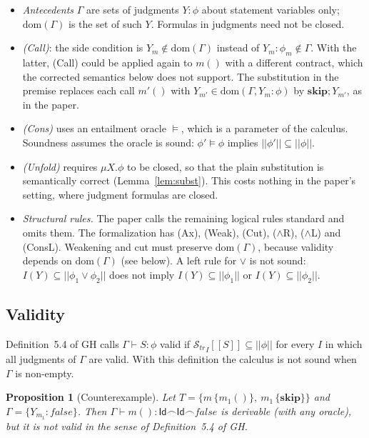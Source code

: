 \documentclass[11pt]{article}
\newcommand{\sem}[1]{[\![ #1 ]\!]}
\newcommand{\fsem}[1]{|\!|#1|\!|}
\newcommand{\Str}{{\mathcal{S}_{\mathit{tr}}}}
\newcommand{\chop}{\smallfrown}
\newcommand{\Id}{\mathsf{Id}}
\newcommand{\dom}{\mathrm{dom}}
\newcommand{\kw}[1]{\mathbf{#1}}
\newcommand{\skipS}{\kw{skip}}
\newcommand{\call}[1]{#1()}
\newcommand{\GH}[1]{#1 of GH}
\theoremstyle{plain}
\newtheorem{proposition}[theorem]{Proposition}
\theoremstyle{definition}
\theoremstyle{remark}
\begin{document}
\begin{itemize}
\item \emph{Antecedents} $\Gamma$ are sets of judgments $Y : \phi$ about
  statement variables only; $\dom(\Gamma)$ is the set of such $Y$. Formulas
  in judgments need not be closed.
\item \emph{(Call)}: the side condition is $Y_m \notin \dom(\Gamma)$ instead
  of $Y_m : \phi_m \notin \Gamma$. With the latter, (Call) could be applied
  again to $\call{m}$ with a different contract, which the corrected
  semantics below does not support. The substitution in the premise replaces
  each call $\call{m'}$ with $Y_{m'} \in \dom(\Gamma, Y_m : \phi)$ by
  $\skipS; Y_{m'}$, as in the paper.
\item \emph{(Cons)} uses an entailment oracle $\models$, which is a parameter
  of the calculus. Soundness assumes the oracle is sound: $\phi' \models
  \phi$ implies $\fsem{\phi'} \subseteq \fsem{\phi}$.
\item \emph{(Unfold)} requires $\mu X.\phi$ to be closed, so that the plain
  substitution is semantically correct (Lemma~\ref{lem:subst}). This costs
  nothing in the paper's setting, where judgment formulas are closed.
\item \emph{Structural rules.} The paper calls the remaining logical rules
  standard and omits them. The formalization has (Ax), (Weak), (Cut),
  ($\land$R), ($\land$L) and (ConsL). Weakening and cut must preserve
  $\dom(\Gamma)$, because validity depends on $\dom(\Gamma)$ (see below).
  A left rule for $\lor$ is not sound: $I(Y) \subseteq \fsem{\phi_1 \lor
    \phi_2}$ does not imply $I(Y) \subseteq \fsem{\phi_1}$ or $I(Y) \subseteq
  \fsem{\phi_2}$.
\end{itemize}

\subsection{Validity}\label{sec:validity}

\GH{Definition~5.4} calls $\Gamma \vdash S : \phi$ valid if
$\Str_I\sem{S} \subseteq \fsem{\phi}$ for every $I$ in which all judgments
of $\Gamma$ are valid. With this definition the calculus is not sound when
$\Gamma$ is non-empty.

\begin{proposition}[Counterexample]\label{prop:counter}
  Let $T = \{m\,\{\call{m_1}\},\ m_1\,\{\skipS\}\}$ and
  $\Gamma = \{Y_{m_1} : \mathit{false}\}$. Then
  $\Gamma \vdash \call{m} : \Id\chop\Id\chop\mathit{false}$ is derivable
  (with any oracle), but it is not valid in the sense of \GH{Definition~5.4}.
\end{proposition}
\end{document}
